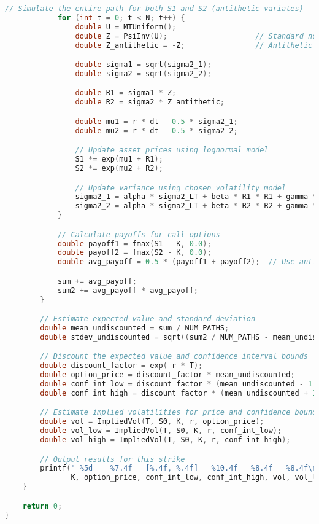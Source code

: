 \documentclass{report}
\begin{document}
\begin{lstlisting}[language=C++]
            // Simulate the entire path for both S1 and S2 (antithetic variates)
            for (int t = 0; t < N; t++) {
                double U = MTUniform();
                double Z = PsiInv(U);                    // Standard normal variable
                double Z_antithetic = -Z;                // Antithetic counterpart

                double sigma1 = sqrt(sigma2_1);
                double sigma2 = sqrt(sigma2_2);

                double R1 = sigma1 * Z;
                double R2 = sigma2 * Z_antithetic;

                double mu1 = r * dt - 0.5 * sigma2_1;
                double mu2 = r * dt - 0.5 * sigma2_2;

                // Update asset prices using lognormal model
                S1 *= exp(mu1 + R1);
                S2 *= exp(mu2 + R2);

                // Update variance using chosen volatility model
                sigma2_1 = alpha * sigma2_LT + beta * R1 * R1 + gamma * sigma2_1;
                sigma2_2 = alpha * sigma2_LT + beta * R2 * R2 + gamma * sigma2_2;
            }

            // Calculate payoffs for call options
            double payoff1 = fmax(S1 - K, 0.0);
            double payoff2 = fmax(S2 - K, 0.0);
            double avg_payoff = 0.5 * (payoff1 + payoff2);  // Use antithetic average

            sum += avg_payoff;
            sum2 += avg_payoff * avg_payoff;
        }

        // Estimate expected value and standard deviation
        double mean_undiscounted = sum / NUM_PATHS;
        double stdev_undiscounted = sqrt((sum2 / NUM_PATHS - mean_undiscounted * mean_undiscounted) / NUM_PATHS);

        // Discount the expected value and confidence interval bounds
        double discount_factor = exp(-r * T);
        double option_price = discount_factor * mean_undiscounted;
        double conf_int_low = discount_factor * (mean_undiscounted - 1.96 * stdev_undiscounted);
        double conf_int_high = discount_factor * (mean_undiscounted + 1.96 * stdev_undiscounted);

        // Estimate implied volatilities for price and confidence bounds
        double vol = ImpliedVol(T, S0, K, r, option_price);
        double vol_low = ImpliedVol(T, S0, K, r, conf_int_low);
        double vol_high = ImpliedVol(T, S0, K, r, conf_int_high);

        // Output results for this strike
        printf(" %5d    %7.4f   [%.4f, %.4f]   %10.4f   %8.4f   %8.4f\n",
               K, option_price, conf_int_low, conf_int_high, vol, vol_low, vol_high);
    }

    return 0;
}
\end{lstlisting}


\pagebreak
\end{document}
